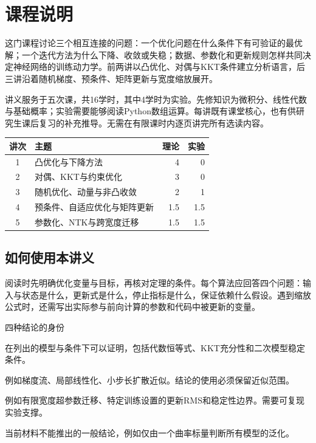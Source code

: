 \chapter*{课程说明}
这门课程讨论三个相互连接的问题：一个优化问题在什么条件下有可验证的最优解；一个迭代方法为什么下降、收敛或失稳；数据、参数化和更新规则怎样共同决定神经网络的训练动力学。前两讲以凸优化、对偶与KKT条件建立分析语言，后三讲沿着随机梯度、预条件、矩阵更新与宽度缩放展开。

讲义服务于五次课，共16学时，其中4学时为实验。先修知识为微积分、线性代数与基础概率；实验需要能够阅读Python数组运算。每讲既有课堂核心，也有供研究生课后复习的补充推导。无需在有限课时内逐页讲完所有选读内容。

\begin{center}
\begin{tabularx}{\textwidth}{cXrr}
\toprule
讲次 & 主题 & 理论 & 实验\\
\midrule
1 & 凸优化与下降方法 & 4 & 0\\
2 & 对偶、KKT与约束优化 & 3 & 0\\
3 & 随机优化、动量与非凸收敛 & 2 & 1\\
4 & 预条件、自适应优化与矩阵更新 & 1.5 & 1.5\\
5 & 参数化、NTK与跨宽度迁移 & 1.5 & 1.5\\
\bottomrule
\end{tabularx}
\end{center}

\section*{如何使用本讲义}
阅读时先明确优化变量与目标，再核对定理的条件。每个算法应回答四个问题：输入与状态是什么，更新式是什么，停止指标是什么，保证依赖什么假设。遇到缩放公式时，还需写出实际参与前向计算的参数和代码中被更新的变量。

\begin{coursebox}{四种结论的身份}
\begin{description}[style=nextline,leftmargin=1em]
\item[精确结论] 在列出的模型与条件下可以证明，包括代数恒等式、KKT充分性和二次模型稳定条件。
\item[近似模型] 例如梯度流、局部线性化、小步长扩散近似。结论的使用必须保留近似范围。
\item[经验观察] 例如有限宽度超参数迁移、特定训练设置的更新RMS和稳定性边界。需要可复现实验支撑。
\item[研究问题] 当前材料不能推出的一般结论，例如仅由一个曲率标量判断所有模型的泛化。
\end{description}
\end{coursebox}

